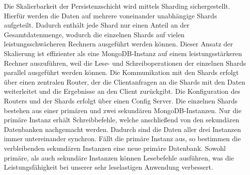 \documentclass[conference,a4paper,flushend]{cs-techrep}
\begin{document}
Die Skalierbarkeit der Persistenzschicht wird mittels Sharding sichergestellt. Hierfür werden die Daten auf mehrere voneinander unabhängige Shards aufgeteilt. Dadurch enthält jede Shard nur einen Anteil an der Gesamtdatenmenge, wodurch die einzelnen Shards auf vielen leistungsschwächeren Rechnern ausgeführt werden können. Dieser Ansatz der Skalierung ist effizienter als eine MongoDB-Instanz auf einem leistungsstärkeren Rechner auszuführen, weil die Lese- und Schreiboperationen der einzelnen Shards parallel ausgeführt werden können. Die Kommunikation mit den Shards erfolgt über einen zentralen Router, der die Clientanfragen an die Shards mit den Daten weiterleitet und die Ergebnisse an den Client zurückgibt. Die Konfiguration des Routers und der Shards erfolgt über einen Config Server. Die einzelnen Shards bestehen aus einer primären und zwei sekundären MongoDB-Instanzen. Nur die primäre Instanz erhält Schreibbefehle, welche anschließend von den sekundären Datenbanken nachgemacht werden. Dadurch sind die Daten aller drei Instanzen immer untereinander synchron. Fällt die primäre Instanz aus, so bestimmen die verbleibenden sekundären Instanzen eine neue primäre Datenbank. Sowohl primäre, als auch sekundäre Instanzen können Lesebefehle ausführen, was die Leistungsfähigkeit bei unserer sehr leselastigen Anwendung verbessert.
\end{document}
